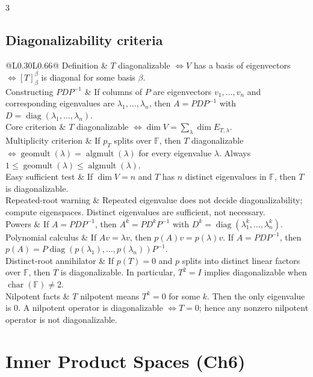\documentclass[10pt]{article}
\makeatletter
\newcommand{\F}{\mathbb{F}}
\newcommand{\diag}{\operatorname{diag}}
\newcommand{\algmult}{\operatorname{algmult}}
\newcommand{\geomult}{\operatorname{geomult}}
\newcommand{\cheattable}[1]{\begin{tabular}{@{}L{0.30\columnwidth}L{0.66\columnwidth}@{}}#1\end{tabular}}
\makeatother
\begin{document}
\begin{multicols}{3}
\subsection*{Diagonalizability criteria}
\cheattable{
Definition & $T$ diagonalizable $\iff V$ has a basis of eigenvectors $\iff [T]^\beta_\beta$ is diagonal for some basis $\beta$.\\
Constructing $PDP^{-1}$ & If columns of $P$ are eigenvectors $v_1,\dots,v_n$ and corresponding eigenvalues are $\lambda_1,\dots,\lambda_n$, then $A=PDP^{-1}$ with $D=\diag(\lambda_1,\dots,\lambda_n)$.\\
Core criterion & $T$ diagonalizable $\iff \dim V=\sum_\lambda \dim E_{T,\lambda}$.\\
Multiplicity criterion & If $p_T$ splits over $\F$, then $T$ diagonalizable $\iff \geomult(\lambda)=\algmult(\lambda)$ for every eigenvalue $\lambda$. Always $1\le \geomult(\lambda)\le \algmult(\lambda)$.\\
Easy sufficient test & If $\dim V=n$ and $T$ has $n$ distinct eigenvalues in $\F$, then $T$ is diagonalizable.\\
Repeated-root warning & Repeated eigenvalue does not decide diagonalizability; compute eigenspaces. Distinct eigenvalues are sufficient, not necessary.\\
Powers & If $A=PDP^{-1}$, then $A^k=PD^kP^{-1}$ with $D^k=\diag(\lambda_1^k,\dots,\lambda_n^k)$.\\
Polynomial calculus & If $Av=\lambda v$, then $p(A)v=p(\lambda)v$. If $A=PDP^{-1}$, then $p(A)=P\diag(p(\lambda_1),\dots,p(\lambda_n))P^{-1}$.\\
Distinct-root annihilator & If $p(T)=0$ and $p$ splits into distinct linear factors over $\F$, then $T$ is diagonalizable. In particular, $T^2=I$ implies diagonalizable when $\operatorname{char}(\F)\neq 2$.\\
Nilpotent facts & $T$ nilpotent means $T^k=0$ for some $k$. Then the only eigenvalue is $0$. A nilpotent operator is diagonalizable $\iff T=0$; hence any nonzero nilpotent operator is not diagonalizable.\\
}

\section*{Inner Product Spaces (Ch6)}


\end{multicols}
\end{document}
